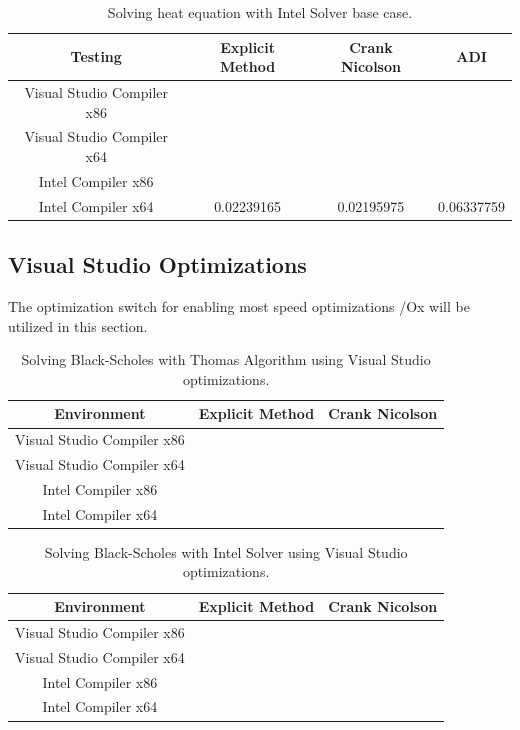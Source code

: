 \documentclass[12pt, oneside]{book}
\theoremstyle{plain}
\theoremstyle{definition}
\begin{document}
 
\begin{table}[htp!]
\centering
 \begin{tabular}{||c c c c||} 
 \hline
 Testing & Explicit Method & Crank Nicolson & ADI\\ [0.5ex] 
 \hline\hline\hline
 Visual Studio Compiler x86 \\ 
 Visual Studio Compiler x64 &  \\
 Intel Compiler x86 & \\
 Intel Compiler x64 & 0.02239165 & 0.02195975 & 0.06337759\\[1ex] 
 \hline
 \end{tabular}
 \caption{Solving heat equation with Intel Solver base case.}
\end{table}
 

\subsection{Visual Studio Optimizations} 
 The optimization switch for enabling most speed optimizations /Ox will be utilized in this section. 
\begin{table}[h!]
\centering
 \begin{tabular}{||c c c||} 
 \hline
 Environment & Explicit Method & Crank Nicolson\\ [0.5ex] 
 \hline\hline\hline
 Visual Studio Compiler x86 & \\ 
 Visual Studio Compiler x64 & \\
 Intel Compiler x86 & \\
 Intel Compiler x64 & \\ [1ex] 
 \hline
 \end{tabular}
 \caption{Solving Black-Scholes with Thomas Algorithm using Visual Studio optimizations.}
\end{table}

\begin{table}[h!]
\centering
 \begin{tabular}{||c c c||} 
 \hline
 Environment & Explicit Method & Crank Nicolson\\ [0.5ex] 
 \hline\hline\hline
 Visual Studio Compiler x86 & \\ 
 Visual Studio Compiler x64 & \\
 Intel Compiler x86 & \\
 Intel Compiler x64 & \\ [1ex] 
 \hline
 \end{tabular}
 \caption{Solving Black-Scholes with Intel Solver using Visual Studio optimizations.}
\end{table}
\end{document}
